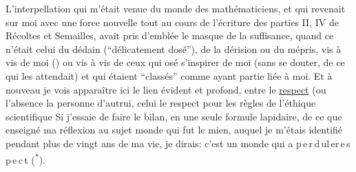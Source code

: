 L'interpellation qui m'était venue du monde des mathématiciens, et qui revenait sur moi avec une force nouvelle tout au cours de l'écriture des parties II, IV de Récoltes et Semailles,  avait pris d'emblée le masque de la suffisance, quand ce n'était celui du dédain (``délicatement dosé''), de la dérision ou du mépris,  vis à vis de moi () ou   vis à vis de ceux qui  osé s'inspirer de moi\deleted{\unsure{,}} (sans se douter,  de ce qui les attendait) et qui étaient ``classés'' comme ayant partie liée à moi. Et à nouveau je vois apparaître ici le lien évident et profond, entre le \uline{respect} (ou l'absence  la personne d'autrui,  celui   le respect pour les règles  de l'éthique scientifique  Si j'essaie de faire le bilan, en une  seule formule lapidaire, de ce que  enseigné ma réflexion au sujet   monde qui fut le mien, auquel je m'étais identifié pendant plus de vingt ans de ma vie, je dirais: c'est un monde qui a \mbox{p\,e\,r\,d\,u\quad l\,e\quad r\,e\,s\,p\,e\,c\,t} (\textsuperscript{*}).

